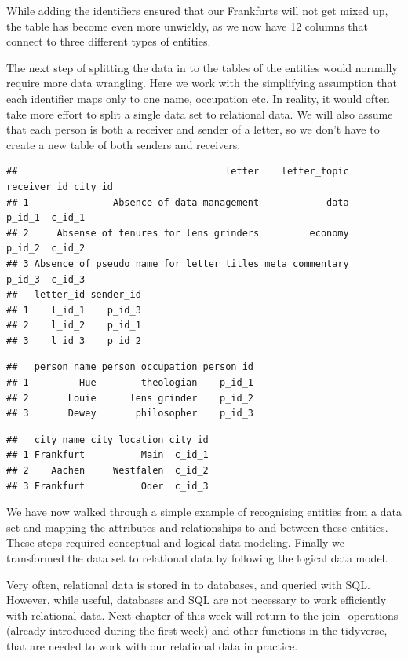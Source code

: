 \documentclass[
]{book}
\begin{document}
While adding the identifiers ensured that our Frankfurts will not get mixed up, the table has become even more unwieldy, as we now have 12 columns that connect to three different types of entities.

The next step of splitting the data in to the tables of the entities would normally require more data wrangling. Here we work with
the simplifying assumption that each identifier maps only to one name, occupation etc. In reality, it would often take more effort to split a single data set to relational data. We will also assume that each person is both a receiver and sender of a letter, so we don't have
to create a new table of both senders and receivers.

\begin{verbatim}
##                                     letter    letter_topic receiver_id city_id
## 1               Absence of data management            data      p_id_1  c_id_1
## 2     Absense of tenures for lens grinders         economy      p_id_2  c_id_2
## 3 Absence of pseudo name for letter titles meta commentary      p_id_3  c_id_3
##   letter_id sender_id
## 1    l_id_1    p_id_3
## 2    l_id_2    p_id_1
## 3    l_id_3    p_id_2
\end{verbatim}

\begin{verbatim}
##   person_name person_occupation person_id
## 1         Hue        theologian    p_id_1
## 2       Louie      lens grinder    p_id_2
## 3       Dewey       philosopher    p_id_3
\end{verbatim}

\begin{verbatim}
##   city_name city_location city_id
## 1 Frankfurt          Main  c_id_1
## 2    Aachen     Westfalen  c_id_2
## 3 Frankfurt          Oder  c_id_3
\end{verbatim}

We have now walked through a simple example of recognising entities from a data set and mapping the attributes and relationships to and between these entities. These steps required conceptual and logical data modeling. Finally we transformed the data set to relational data by following the logical data model.

Very often, relational data is stored in to databases, and queried with SQL. However, while useful, databases and SQL are not necessary
to work efficiently with relational data. Next chapter of this week will return to the join\_operations (already introduced during the first week) and other functions in the tidyverse, that are needed to work with our relational data in practice.
\end{document}
